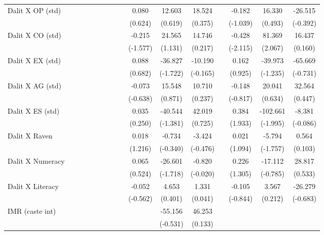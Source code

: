 {\begin{longtable}{@{\extracolsep{\fill}}lccccccccccccccc}
    Dalit X OP (std) &   &   &   &   &   &   &   &   & 0.080 & 12.603 & 18.524 &   & -0.182 & 16.330 & -26.515 \\
      &   &   &   &   &   &   &   &   & (0.624) & (0.619) & (0.375) &   & (-1.039) & (0.493) & (-0.392) \\
    Dalit X CO (std) &   &   &   &   &   &   &   &   & -0.215 & 24.565 & 14.746 &   & -0.428 & 81.369 & 16.437 \\
      &   &   &   &   &   &   &   &   & (-1.577) & (1.131) & (0.217) &   & (-2.115) & (2.067) & (0.160) \\
    Dalit X EX (std) &   &   &   &   &   &   &   &   & 0.088 & -36.827 & -10.190 &   & 0.162 & -39.973 & -65.669 \\
      &   &   &   &   &   &   &   &   & (0.682) & (-1.722) & (-0.165) &   & (0.925) & (-1.235) & (-0.731) \\
    Dalit X AG (std) &   &   &   &   &   &   &   &   & -0.073 & 15.548 & 10.710 &   & -0.148 & 20.041 & 32.564 \\
      &   &   &   &   &   &   &   &   & (-0.638) & (0.871) & (0.237) &   & (-0.817) & (0.634) & (0.447) \\
    Dalit X ES (std) &   &   &   &   &   &   &   &   & 0.035 & -40.544 & 42.019 &   & 0.384 & -102.661 & -8.381 \\
      &   &   &   &   &   &   &   &   & (0.250) & (-1.381) & (0.725) &   & (1.933) & (-1.995) & (-0.086) \\
    Dalit X Raven &   &   &   &   &   &   &   &   & 0.018 & -0.734 & -3.424 &   & 0.021 & -5.794 & 0.564 \\
      &   &   &   &   &   &   &   &   & (1.216) & (-0.340) & (-0.476) &   & (1.094) & (-1.757) & (0.103) \\
    Dalit X Numeracy &   &   &   &   &   &   &   &   & 0.065 & -26.601 & -0.820 &   & 0.226 & -17.112 & 28.817 \\
      &   &   &   &   &   &   &   &   & (0.524) & (-1.718) & (-0.020) &   & (1.305) & (-0.785) & (0.533) \\
    Dalit X Literacy &   &   &   &   &   &   &   &   & -0.052 & 4.653 & 1.331 &   & -0.105 & 3.567 & -26.279 \\
      &   &   &   &   &   &   &   &   & (-0.562) & (0.401) & (0.041) &   & (-0.844) & (0.212) & (-0.683) \\
    IMR (caste int) &   &   &   &   &   &   &   &   &   & -55.156 & 46.253 &   &   &   &  \\
      &   &   &   &   &   &   &   &   &   & (-0.531) & (0.133) &   &   &   &  \\

\end{longtable}}
